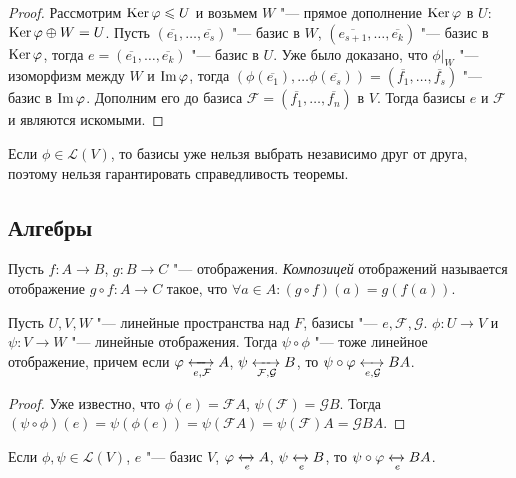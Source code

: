 \begin{proof}
	Рассмотрим $\ke{\phi} \le U$ и возьмем $W$ "--- прямое дополнение $\ke{\phi}$ в $U$: $\ke{\phi} \oplus W = U$. Пусть $(\overline{e_1}, \dots, \overline{e_s})$ "--- базис в $W$, $(\overline{e_{s+1}}, \dots, \overline{e_k})$ "--- базис в $\ke{\phi}$, тогда $e = (\overline{e_1}, \dots, \overline{e_k})$ "--- базис в $U$. Уже было доказано, что $\phi|_W$ "--- изоморфизм между $W$ и $\im{\phi}$, тогда $(\phi(\overline{e_1}), \dots \phi(\overline{e_s})) = (\overline{f_1}, \dots, \overline{f_s})$ "--- базис в $\im{\phi}$. Дополним его до базиса $\mathcal{F} = (\overline{f_1}, \dots, \overline{f_n})$ в $V$. Тогда базисы $e$ и $\mathcal{F}$ и являются искомыми.
\end{proof}

\begin{note}
	Если $\phi \in \mathcal{L}(V)$, то базисы уже нельзя выбрать независимо друг от друга, поэтому нельзя гарантировать справедливость теоремы.
\end{note}

\subsection{Алгебры}

\begin{definition}
	Пусть $f: A \rightarrow B$, $g: B\rightarrow C$ "--- отображения. \textit{Композицей} отображений называется отображение $g \circ f: A \rightarrow C$ такое, что $\forall a \in A: (g \circ f)(a) = g(f(a))$.
\end{definition}

\begin{proposition}
	Пусть $U, V, W$ "--- линейные пространства над $F$, базисы "--- $e, \mathcal{F}, \mathcal{G}$. $\phi: U \rightarrow V$ и $\psi: V \rightarrow W$ "--- линейные отображения. Тогда $\psi \circ \phi$ "--- тоже линейное отображение, причем если $\phi \xleftrightarrow[e, \mathcal{F}]{} A$, $\psi \xleftrightarrow[\mathcal{F}, \mathcal{G}]{} B$, то $\psi \circ \phi \xleftrightarrow[e, \mathcal{G}]{} BA$.
\end{proposition}

\begin{proof}
	Уже известно, что $\phi(e) = \mathcal{F}A$, $\psi(\mathcal{F}) = \mathcal{G}B$. Тогда $(\psi \circ \phi)(e) = \psi(\phi(e)) = \psi(\mathcal{F}A) = \psi(\mathcal{F})A = \mathcal{G}BA$.
\end{proof}

\begin{corollary}
	Если $\phi, \psi \in \mathcal{L}(V)$, $e$ "--- базис $V$, $\phi \xleftrightarrow[e]{} A$, $\psi \xleftrightarrow[e]{} B$, то $\psi \circ \phi \xleftrightarrow[e]{} BA$.
\end{corollary}

